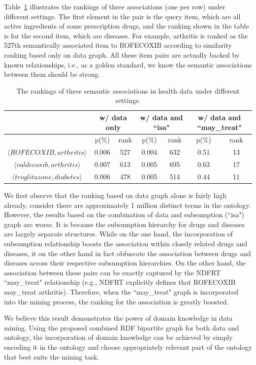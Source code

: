 Table~\ref{tbl:health_exp} illustrates the rankings of three associations (one per row) under different settings. The first element in the pair is the query item, which are all active ingredients of some prescription drugs, and the ranking shown in the table is for the second item, which are diseases. For example, arthritis is ranked as the 527th semantically associated item to ROFECOXIB according to similarity ranking based only on data graph. All these item pairs are actually backed by known relationships, i.e., as a golden standard, we know the semantic associations between them should be strong.


\begin{table}[tbh]\scriptsize
\begin{center}
\begin{tabular}{ c || c  c || c  c || c  c }
\hline
        &   \multicolumn{2}{c||}{w/ data only}  &   \multicolumn{2}{c||}{w/ data and ``isa"} & \multicolumn{2}{c}{w/ data and ``may\_treat"}\\
\hline
                        	&   p(\%)   &   rank    &   p(\%)    &   rank    &   p(\%)    &    rank    \\
\hline
$\langle ROFECOXIB, arthritis\rangle$  &   0.006   &   527     &   0.004    &   632     &   0.51     &     13     \\
$\langle valdecoxib, arthritis\rangle$  &   0.007   &   613     &   0.005    &   695     &   0.63     &     17     \\
$\langle troglitazone, diabetes\rangle$  &   0.006   &   478     &   0.005    &   514     &   0.44     &     11     \\
\hline
\end{tabular}
\end{center}
\caption{\label{tbl:health_exp}The rankings of three semantic associations in health data under different settings.}
\end{table}

We first observe that the ranking based on data graph alone is fairly high already, consider there are approximately 1 million distinct terms in the ontology. However, the results based on the combination of data and subsumption (``isa") graph are worse. It is because the subsumption hierarchy for drugs and diseases are largely separate structures. While on the one hand, the incorporation of subsumption relationship boosts the association within closely related drugs and diseases, it on the other hand in fact obfuscate the association between drugs and diseases across their respective subsumption hierarchies. On the other hand, the association between these pairs can be exactly captured by the NDFRT ``may\_treat" relationship (e.g., NDFRT explicitly defines that ROFECOXIB may\_treat arthritis). Therefore, when the ``may\_treat" graph is incorporated into the mining process, the ranking for the association is greatly boosted.

We believe this result demonstrates the power of domain knowledge in data mining. Using the proposed combined RDF bipartite graph for both data and ontology, the incorporation of domain knowledge can be achieved by simply encoding it in the ontology and choose appropriately relevant part of the ontology that best suits the mining task. 